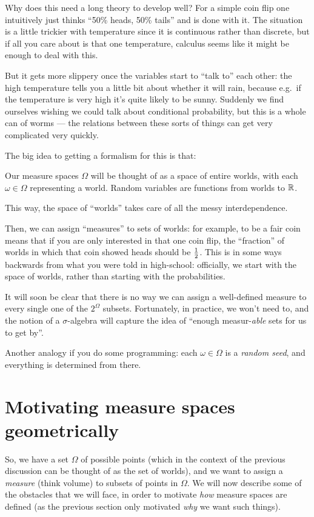 Why does this need a long theory to develop well?
For a simple coin flip one intuitively just thinks
``50\% heads, 50\% tails'' and is done with it.
The situation is a little trickier with temperature
since it is continuous rather than discrete,
but if all you care about is that one temperature,
calculus seems like it might be enough to deal with this.

But it gets more slippery once the variables start to ``talk to'' each other:
the high temperature tells you a little bit about whether it will rain,
because e.g.\ if the temperature is very high it's quite likely to be sunny.
Suddenly we find ourselves wishing we could talk about conditional probability,
but this is a whole can of worms --- the relations
between these sorts of things can get very complicated very quickly.

The big idea to getting a formalism for this is that:
\begin{moral}
	Our measure spaces $\Omega$ will be thought of as a space of entire worlds,
	with each $\omega \in \Omega$ representing a world.
	Random variables are functions from worlds to $\mathbb R$.
\end{moral}
This way, the space of ``worlds'' takes care of all the messy interdependence.

Then, we can assign ``measures'' to sets of worlds:
for example, to be a fair coin means that if you are only interested in
that one coin flip, the ``fraction'' of worlds in
which that coin showed heads should be $\frac{1}{2}$.
This is in some ways backwards from what you were told in high-school:
officially, we start with the space of worlds,
rather than starting with the probabilities.

It will soon be clear that there is no way we can assign
a well-defined measure to every single one of the $2^\Omega$ subsets.
Fortunately, in practice, we won't need to,
and the notion of a $\sigma$-algebra will capture the idea
of ``enough measur-\emph{able} sets for us to get by''.

\begin{remark}
	Another analogy if you do some programming:
	each $\omega \in \Omega$ is a \emph{random seed},
	and everything is determined from there.
\end{remark}

\section{Motivating measure spaces geometrically}
So, we have a set $\Omega$ of possible points
(which in the context of the previous discussion
can be thought of as the set of worlds),
and we want to assign a \emph{measure} (think volume)
to subsets of points in $\Omega$.
We will now describe some of the obstacles that we will face,
in order to motivate \emph{how} measure spaces are defined
(as the previous section only motivated \emph{why} we want such things).

